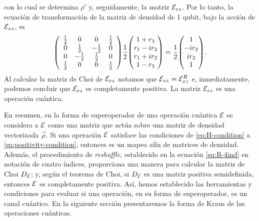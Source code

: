 con lo cual se determina $\rho'$ y, seguidamente,
la matriz $\mathcal{E}_{xz}$.
Por lo tanto, la ecuación de transformación de la matriz 
de densidad de 1 qubit, bajo la acción de $\mathcal{E}_{xz}$, es
\begin{align}
\mqty(
\begin{array}{cccc}
\frac{1}{2} & 0 & 0 & \frac{1}{2} \\
0 & \frac{1}{2} & -\frac{1}{2} & 0 \\
0 & -\frac{1}{2} & \frac{1}{2} & 0 \\
\frac{1}{2} & 0 & 0 & \frac{1}{2} \\
\end{array}
)
\frac{1}{2}
\mqty(
1+r_3\\r_1-ir_2\\r_1+ir_2\\1-r_3
)
=
\frac{1}{2}
\mqty(
1\\-ir_2\\ir_2\\1
).
\label{eq:QC-ex2-SR}
\end{align}
Al calcular la matriz de Choi de $\mathcal{E}_{xz}$ notamos 
que $\mathcal{E}_{xz}=\mathcal{E}_{xz}^R$ e, inmediatamente, podemos concluir
que $\mathcal{E}_{xz}$ es completamente positiva. La matriz $\mathcal{E}_{xz}$
es una operación cuántica.

En resumen, en la forma de superoperador de una operación cuántica $\mathcal{E}$
se considera a $\mathcal{E}$ como una matriz que actúa sobre 
una matriz de densidad vectorizada $\vec{\rho}$. 
Si una operación $\mathcal{E}$ satisface las condiciones de
\eqref{eq:H-condition} a \eqref{eq:positivity-condition}, entonces
es un mapeo afín de matrices de densidad.
Además, el procedimiento de \textit{reshuffle},
establecido en la ecuación \eqref{eq:R-4ind} en notación
de cuatro índices, proporciona una manera para 
calcular la matriz de Choi $D_{\mathcal{E}}$;
y, según el teorema de Choi, si 
$D_{\mathcal{E}}$ es una matriz positiva semidefinida, entonces $\mathcal{E}$ es 
completamente positiva. 
Así, hemos establecido las herramientas y condiciones para evaluar 
si una operación, en su forma de superoperador, es un canal cuántico.
En la siguiente sección presentaremos la forma de Kraus de las operaciones
cuánticas.

